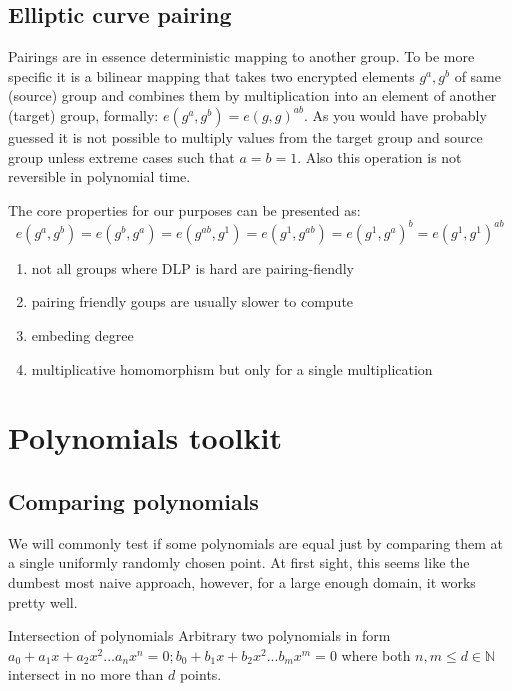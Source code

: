 \subsection{Elliptic curve pairing}
Pairings are in essence deterministic mapping to another group. To be more specific it is a bilinear mapping that takes two encrypted elements $g^a, g^b$ of same (source) group and combines them by multiplication into an element of another (target) group, formally: $e(g^a, g^b) = e(g, g)^{ab}$. As you would have probably guessed it is not possible to multiply values from the target group and source group unless extreme cases such that $a = b = 1$. Also this operation is not reversible in polynomial time. %

The core properties for our purposes can be presented as:
$$e(g^a, g^b) = e(g^b, g^a) = e(g^{ab}, g^1) = e(g^1, g^{ab}) = e(g^1, g^a)^b = e(g^1, g^1)^{ab}$$

\begin{enumerate}
    \item not all groups where DLP is hard are pairing-fiendly
    \item pairing friendly  goups are usually slower to compute
    \item embeding degree
    \item multiplicative homomorphism but only for a single multiplication
\end{enumerate}


\section{Polynomials toolkit}

\subsection{Comparing polynomials}
We will commonly test if some polynomials are equal just by comparing them at a single uniformly randomly chosen point. At first sight, this seems like the dumbest most naive approach, however, for a large enough domain, it works pretty well. 

\begin{theorem}{Intersection of polynomials} \newline
\label{theorem:poly-intersection}
    Arbitrary two polynomials in form $a_0 + a_1x + a_2x^2 ... a_nx^n = 0; b_0 + b_1x + b_2x^2 ... b_m x^m = 0$ where both $n, m \leq d \in \mathbb{N}$ intersect in no more than $d$ points.
\end{theorem}

